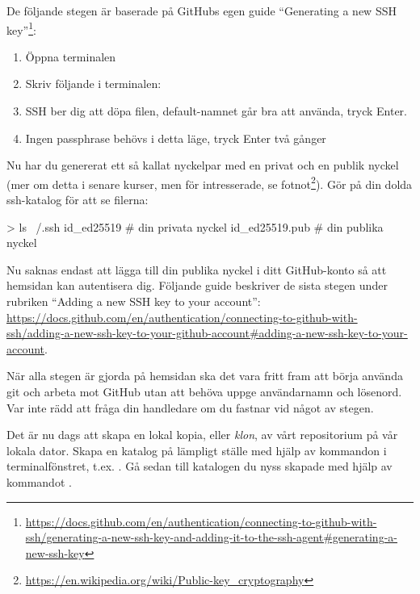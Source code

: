 \begin{Datorarbete}
	\vspace*{3mm}

	\noindent De följande stegen är baserade på GitHubs egen guide ``Generating a new SSH key''\footnote{\url{https://docs.github.com/en/authentication/connecting-to-github-with-ssh/generating-a-new-ssh-key-and-adding-it-to-the-ssh-agent#generating-a-new-ssh-key}}:

	\begin{enumerate}
		\item Öppna terminalen
		\item Skriv följande i terminalen:\\

		\item SSH ber dig att döpa filen, default-namnet går bra att använda, tryck Enter.
		\item Ingen passphrase behövs i detta läge, tryck Enter två gånger
	\end{enumerate}


	\noindent Nu har du genererat ett så kallat nyckelpar med en privat och en publik nyckel (mer om detta i senare kurser, men för intresserade, se fotnot\footnote{\url{https://en.wikipedia.org/wiki/Public-key_cryptography}}). Gör  på din dolda ssh-katalog för att se filerna:
	\begin{Code}
		> ls ~/.ssh
		id_ed25519         # din privata nyckel
		id_ed25519.pub     # din publika nyckel
	\end{Code}

	Nu saknas endast att lägga till din publika nyckel i ditt GitHub-konto så att hemsidan kan autentisera dig. Följande guide beskriver de sista stegen under rubriken ``Adding a new SSH key to your account'': \url{https://docs.github.com/en/authentication/connecting-to-github-with-ssh/adding-a-new-ssh-key-to-your-github-account#adding-a-new-ssh-key-to-your-account}.

	När alla stegen är gjorda på hemsidan ska det vara fritt fram att börja använda git och arbeta mot GitHub utan att behöva uppge användarnamn och lösenord. Var inte rädd att fråga din handledare om du fastnar vid något av stegen.

	\item Det är nu dags att skapa en lokal kopia, eller \emph{klon}, av vårt repositorium på vår lokala dator. Skapa en katalog på lämpligt ställe med hjälp av kommandon i terminalfönstret, t.ex. . Gå sedan till katalogen du nyss skapade med hjälp av kommandot .


\end{Datorarbete}
